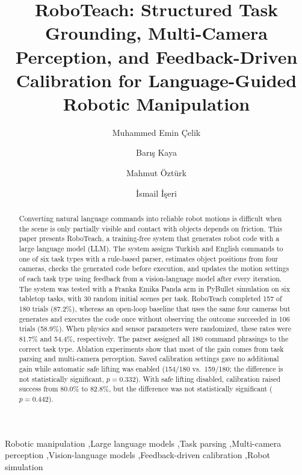 \documentclass[preprint,12pt]{elsarticle}
\begin{document}
\begin{frontmatter}

\title{RoboTeach: Structured Task Grounding, Multi-Camera Perception, and Feedback-Driven Calibration for Language-Guided Robotic Manipulation}

\author[omu]{Muhammed Emin \c{C}elik}
\author[omu]{Bar\i\c{s} Kaya}
\author[omu]{Mahmut \"{O}zt\"{u}rk}
\author[omu]{\.{I}smail \.{I}\c{s}eri}

\address[omu]{Department of Computer Engineering, Ondokuz May\i s University, Samsun, T\"{u}rkiye}

\begin{abstract}
Converting natural language commands into reliable robot motions is difficult when the scene is only partially visible and contact with objects depends on friction. This paper presents RoboTeach, a training-free system that generates robot code with a large language model (LLM). The system assigns Turkish and English commands to one of six task types with a rule-based parser, estimates object positions from four cameras, checks the generated code before execution, and updates the motion settings of each task type using feedback from a vision-language model after every iteration. The system was tested with a Franka Emika Panda arm in PyBullet simulation on six tabletop tasks, with 30 random initial scenes per task. RoboTeach completed 157 of 180 trials (87.2\%), whereas an open-loop baseline that uses the same four cameras but generates and executes the code once without observing the outcome succeeded in 106 trials (58.9\%). When physics and sensor parameters were randomized, these rates were 81.7\% and 54.4\%, respectively. The parser assigned all 180 command phrasings to the correct task type. Ablation experiments show that most of the gain comes from task parsing and multi-camera perception. Saved calibration settings gave no additional gain while automatic safe lifting was enabled (154/180 vs.\ 159/180; the difference is not statistically significant, $p = 0.332$). With safe lifting disabled, calibration raised success from 80.0\% to 82.8\%, but the difference was not statistically significant ($p = 0.442$).
\end{abstract}

\begin{keyword}
Robotic manipulation \sep Large language models \sep Task parsing \sep Multi-camera perception \sep Vision-language models \sep Feedback-driven calibration \sep Robot simulation
\end{keyword}

\end{frontmatter}
\end{document}
